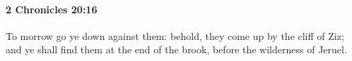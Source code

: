 
		\paragraph{2 Chronicles 20:16} %
			\label{2CHRONICLES-20-16}

			To morrow go ye down against them: behold, they come up by the cliff of Ziz; and ye shall find them at the end of the brook, before the wilderness of Jeruel.


